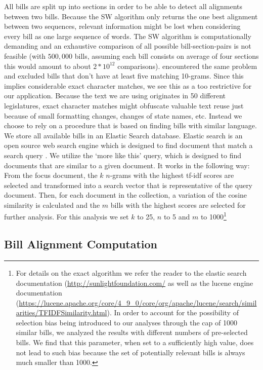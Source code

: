 \documentclass[12pt]{article} %
\begin{document}
All bills are split up into sections in order to be able to detect all alignments between two bills. Because the SW algorithm only returns the one best alignment between two sequences, relevant information might be lost when considering every bill as one large sequence of words. 
The SW algorithm is computationally demanding and an exhaustive comparison of all possible bill-section-pairs is not feasible (with $500,000$ bills, assuming each bill consists on average of four sections this would amount to about $2 * 10^{12}$ comparisons). \citet{wilkerson2015tracing} encountered the same problem and excluded bills that don't have at least five matching 10-grams. Since this implies considerable exact character matches, we see this as a too restrictive for our application. Because the text we are using originates in 50 different legislatures, exact character matches might obfuscate valuable text reuse just because of small formatting changes, changes of state names, etc. 
Instead we choose to rely on a procedure that is based on finding bills with
similar language. We store all available bills in an Elastic Search database.
Elastic search is an open source web search engine which is designed to find
document that match a search query \citep{gormley2015elasticsearch}. We utilize
the `more like this' query, which is designed to find documents that are similar
to a given document. It works in the following way: From the focus document, the
$k$ $n$-grams with the highest tf-idf scores are selected and transformed into a
search vector that is representative of the query document. Then, for each
document in the collection, a variation of the cosine similarity is calculated
and the $m$ bills with the highest scores are selected for further analysis. For
this analysis we set $k$ to 25, $n$ to 5 and $m$ to 1000\footnote{For
details on the exact algorithm we refer the reader to the elastic search
documentation (\url{http://sunlightfoundation.com/} as well as the lucene engine
documentation
(\url{https://lucene.apache.org/core/4_9_0/core/org/apache/lucene/search/similarities/TFIDFSimilarity.html}).
In order to account for the possibility of selection bias being introduced to
our analyses through the cap of 1000 similar bills, we analyzed the results with
different numbers of pre-selected bills. We find that this parameter, when set
to a sufficiently high value, does not lead to such bias because the set of
potentially relevant bills is always much smaller than 1000.}


\subsection{Bill Alignment Computation}
\end{document}
